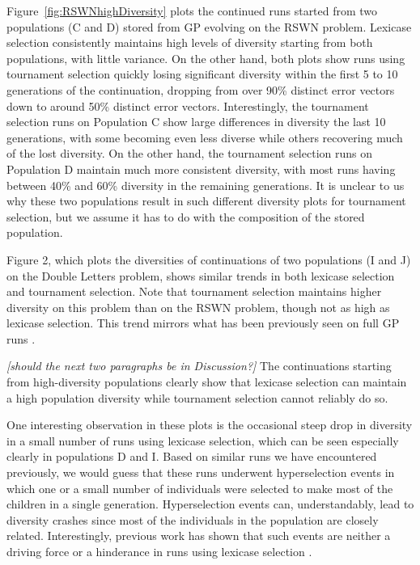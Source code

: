 \documentclass{sig-alternate-05-2015}
\begin{document}
Figure~\ref{fig:RSWNhighDiversity} plots the continued runs started from two populations (C and D) stored from GP evolving on the RSWN problem. Lexicase selection consistently maintains high levels of diversity starting from both populations, with little variance. On the other hand, both plots show runs using tournament selection quickly losing significant diversity within the first 5 to 10 generations of the continuation, dropping from over 90\% distinct error vectors down to around 50\% distinct error vectors. Interestingly, the tournament selection runs on Population C show large differences in diversity the last 10 generations, with some becoming even less diverse while others recovering much of the lost diversity. On the other hand, the tournament selection runs on Population D maintain much more consistent diversity, with most runs having between 40\% and 60\% diversity in the remaining generations. It is unclear to us why these two populations result in such different diversity plots for tournament selection, but we assume it has to do with the composition of the stored population.

Figure 2, which plots the diversities of continuations of two populations (I and J) on the Double Letters problem, shows similar trends in both lexicase selection and tournament selection. Note that tournament selection maintains higher diversity on this problem than on the RSWN problem, though not as high as lexicase selection. This trend mirrors what has been previously seen on full GP runs \cite{Helmuth:2015:GPTP}.

\textit{[should the next two paragraphs be in Discussion?]}
The continuations starting from high-diversity populations clearly show that lexicase selection can maintain a high population diversity while tournament selection cannot reliably do so.

One interesting observation in these plots is the occasional steep drop in diversity in a small number of runs using lexicase selection, which can be seen especially clearly in populations D and I. Based on similar runs we have encountered previously, we would guess that these runs underwent hyperselection events in which one or a small number of individuals were selected to make most of the children in a single generation. Hyperselection events can, understandably, lead to diversity crashes since most of the individuals in the population are closely related. Interestingly, previous work has shown that such events are neither a driving force or a hinderance in runs using lexicase selection \cite{Helmuth:2016:GECCO}.
\end{document}
